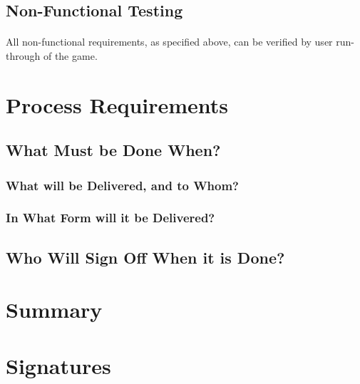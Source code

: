 \subsection{Non-Functional Testing}

\paragraph{} All non-functional requirements, as specified above, can be verified by user run-through of the game.

\section{Process Requirements}

\subsection{What Must be Done When?}

\subsubsection{What will be Delivered, and to Whom?}

\subsubsection{In What Form will it be Delivered?}

\subsection{Who Will Sign Off When it is Done?}

\section{Summary}

\section{Signatures}

\noindent {}

